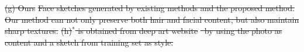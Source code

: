 \documentclass[10pt,twocolumn,letterpaper]{article}
\providecommand{\DIFdeltex}[1]{{\protect\color{red}\sout{#1}}}                      %
\providecommand{\DIFdelFL}[1]{\DIFdel{#1}} %
\providecommand{\DIFdel}[1]{\texorpdfstring{\DIFdeltex{#1}}{}} %
\begin{document}
\DIFdelFL{(g) Ours
}%
{%
\DIFdelFL{Face sketches generated by existing methods and the proposed method. Our method can not only preserve both hair and facial content, but also maintain sharp textures. }%
\DIFdelFL{(h)$^*$ is obtained from deep art website}%
\DIFdelFL{~by using the photo as content and a sketch from training set as style.}}
\footnotetext{%
} 
\end{document}
